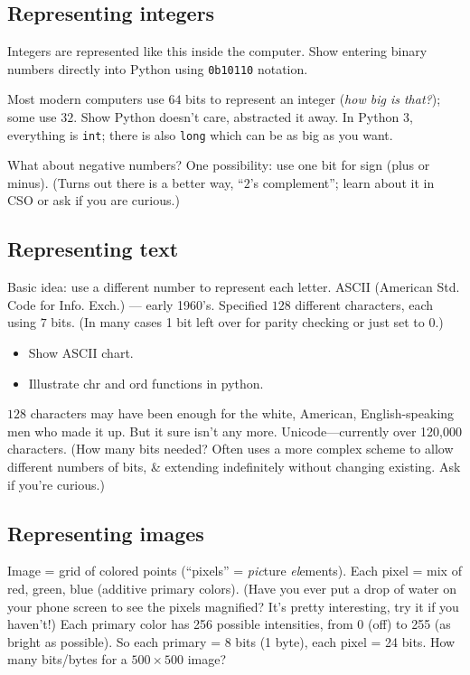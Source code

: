 \documentclass{article}
\begin{document}
\subsection*{Representing integers}

Integers are represented like this inside the computer.  Show entering
binary numbers directly into Python using \verb|0b10110| notation.

Most modern computers use $64$ bits to represent an integer (\emph{how
  big is that?}); some use $32$. Show Python doesn't care, abstracted
it away.  In Python 3, everything is \texttt{int}; there is also
\texttt{long} which can be as big as you want.

What about negative numbers?  One possibility: use one bit for sign
(plus or minus).  (Turns out there is a better way, ``$2$'s
complement''; learn about it in CSO or ask if you are curious.)

\subsection*{Representing text}

Basic idea: use a different number to represent each letter.  ASCII
(American Std. Code for Info. Exch.) --- early 1960's.  Specified
$128$ different characters, each using $7$ bits.  (In many cases 1 bit
left over for parity checking or just set to $0$.)
\begin{itemize}
\item Show ASCII chart.
\item Illustrate chr and ord functions in python.
\end{itemize}
$128$ characters may have been enough for the white, American,
English-speaking men who made it up.  But it sure isn't any more.
Unicode---currently over 120,000 characters. (How many bits needed?
Often uses a more complex scheme to allow different numbers of bits,
\& extending indefinitely without changing existing.  Ask if you're
curious.)

\subsection*{Representing images}

Image = grid of colored points (``pixels'' = \emph{pic}ture
\emph{el}ements).  Each pixel = mix of red, green, blue (additive
primary colors). (Have you ever put a drop of water on your phone
screen to see the pixels magnified?  It's pretty interesting, try it
if you haven't!) Each primary color has 256 possible intensities,
from 0 (off) to 255 (as bright as possible).  So each primary = 8 bits
(1 byte), each pixel = 24 bits.  How many bits/bytes for a $500 \times
500$ image?
\end{document}
